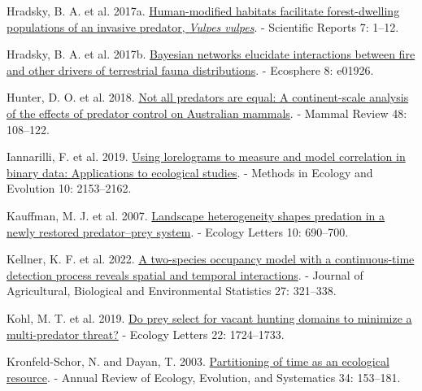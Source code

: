 \documentclass[preprint, 3p, authoryear]{elsarticle} %
\newlength{\cslhangindent}
\newlength{\cslentryspacingunit} %
\newenvironment{CSLReferences}[2] %
 {%
  \setlength{\parindent}{0pt}
  \ifodd #1
  \let\oldpar\par
  \def\par{\hangindent=\cslhangindent\oldpar}
  \fi
  \setlength{\parskip}{#2\cslentryspacingunit}
 }%
 {}
\begin{document}
\begin{CSLReferences}{1}{0}
\leavevmode{}%
Hradsky, B. A. et al. 2017a. \href{https://doi.org/10.1038/s41598-017-12464-7}{Human-modified habitats facilitate forest-dwelling populations of an invasive predator, \emph{{V}ulpes vulpes}}. - Scientific Reports 7: 1--12.

\leavevmode{}%
Hradsky, B. A. et al. 2017b. \href{https://esajournals.onlinelibrary.wiley.com/doi/abs/10.1002/ecs2.1926}{Bayesian networks elucidate interactions between fire and other drivers of terrestrial fauna distributions}. - Ecosphere 8: e01926.

\leavevmode{}%
Hunter, D. O. et al. 2018. \href{https://doi.org/10.1111/mam.12115}{Not all predators are equal: A continent-scale analysis of the effects of predator control on {{A}ustralian} mammals}. - Mammal Review 48: 108--122.

\leavevmode{}%
Iannarilli, F. et al. 2019. \href{https://doi.org/10.1111/2041-210X.13308}{Using lorelograms to measure and model correlation in binary data: Applications to ecological studies}. - Methods in Ecology and Evolution 10: 2153--2162.

\leavevmode{}%
Kauffman, M. J. et al. 2007. \href{https://doi.org/10.1111/j.1461-0248.2007.01059.x}{Landscape heterogeneity shapes predation in a newly restored predator--prey system}. - Ecology Letters 10: 690--700.

\leavevmode{}%
Kellner, K. F. et al. 2022. \href{https://doi.org/10.1007/s13253-021-00482-y}{A two-species occupancy model with a continuous-time detection process reveals spatial and temporal interactions}. - Journal of Agricultural, Biological and Environmental Statistics 27: 321--338.

\leavevmode{}%
Kohl, M. T. et al. 2019. \href{https://doi.org/10.1111/ele.13319}{Do prey select for vacant hunting domains to minimize a multi-predator threat?} - Ecology Letters 22: 1724--1733.

\leavevmode{}%
Kronfeld-Schor, N. and Dayan, T. 2003. \href{https://doi.org/10.1146/annurev.ecolsys.34.011802.132435}{Partitioning of time as an ecological resource}. - Annual Review of Ecology, Evolution, and Systematics 34: 153--181.


\end{CSLReferences}
\end{document}
